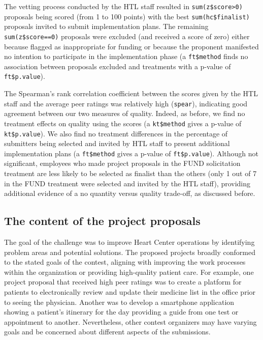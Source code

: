 \documentclass[12pt, titlepage]{article}
\begin{document}
The vetting process conducted by the HTL staff resulted in
\texttt{sum(z\$score\textgreater{}0)} proposals being scored (from 1 to
100 points) with the best \texttt{sum(hc\$finalist)} proposals invited
to submit implementation plans. The remaining \texttt{sum(z\$score==0)}
proposals were excluded (and received a score of zero) either because
flagged as inappropriate for funding or because the proponent manifested
no intention to participate in the implementation phase (a
\texttt{ft\$method} finds no association between proposals excluded and
treatments with a p-value of \texttt{ft\$p.value}).

The Spearman's rank correlation coefficient between the scores given by
the HTL staff and the average peer ratings was relatively high
(\texttt{spear}), indicating good agreement between our two measures of
quality. Indeed, as before, we find no treatment effects on quality
using the scores (a \texttt{kt\$method} gives a p-value of
\texttt{kt\$p.value}). We also find no treatment differences in the
percentage of submitters being selected and invited by HTL staff to
present additional implementation plans (a \texttt{ft\$method} gives a
p-value of \texttt{ft\$p.value}). Although not significant, employees
who made project proposals in the FUND solicitation treatment are less
likely to be selected as finalist than the others (only 1 out of 7 in
the FUND treatment were selected and invited by the HTL staff),
providing additional evidence of a no quantity versus quality trade-off,
as discussed before.

\subsection{The content of the project
proposals}\label{the-content-of-the-project-proposals}

The goal of the challenge was to improve Heart Center operations by
identifying problem areas and potential solutions. The proposed projects
broadly conformed to the stated goals of the contest, aligning with
improving the work processes within the organization or providing
high-quality patient care. For example, one project proposal that
received high peer ratings was to create a platform for patients to
electronically review and update their medicine list in the office prior
to seeing the physician. Another was to develop a smartphone application
showing a patient's itinerary for the day providing a guide from one
test or appointment to another. Nevertheless, other contest organizers
may have varying goals and be concerned about different aspects of the
submissions.
\end{document}
